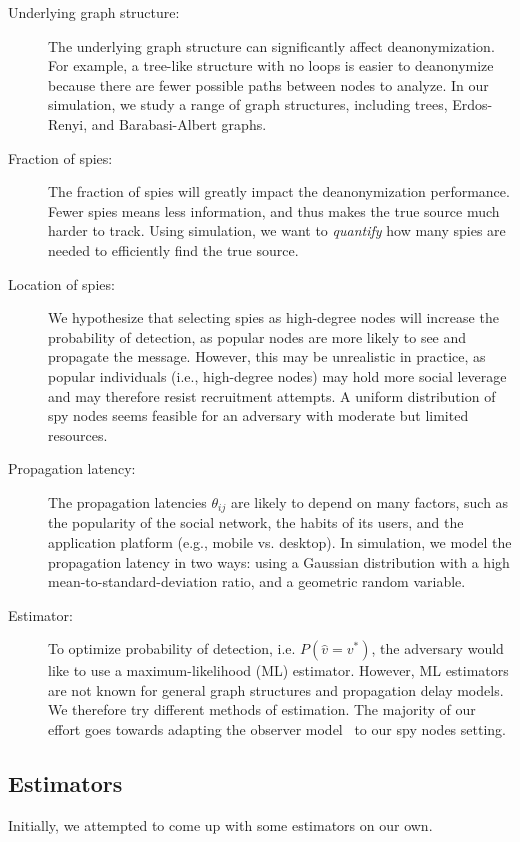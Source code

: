 \begin{description}
\vspace{-0.1in}
\item[Underlying graph structure:] The underlying graph structure can significantly affect deanonymization. For example, a tree-like structure with no loops is easier to deanonymize because there are fewer possible paths between nodes to analyze. In our simulation, we study a range of graph structures, including trees, Erdos-Renyi, and Barabasi-Albert graphs.
\item[Fraction of spies:] The fraction of spies will greatly impact the deanonymization performance. Fewer spies means less information, and thus makes the true source much harder to track. Using simulation, we want to \emph{quantify} how many spies are needed to efficiently find the true source.
\item[Location of spies:] We hypothesize that selecting spies as high-degree nodes will increase the probability of detection, as popular nodes are more likely to see and propagate the message. However, this may be unrealistic in practice, as popular individuals (i.e., high-degree nodes) may hold more social leverage and may therefore resist recruitment attempts. A uniform distribution of spy nodes seems feasible for an adversary with moderate but limited resources. 
\item[Propagation latency:] The propagation latencies $\theta_{ij}$ are likely to depend on many factors, such as the popularity of the social network, the habits of its users, and the application platform (e.g., mobile vs. desktop).
In simulation, we model the propagation latency in two ways: using a Gaussian distribution with a high mean-to-standard-deviation ratio, and a geometric random variable. 
\item[Estimator:] To optimize probability of detection, i.e. $P(\hat v=v^*)$, the adversary would like to use a maximum-likelihood (ML) estimator. However, ML estimators are not known for general graph structures and propagation delay models. We therefore try different methods of estimation. The majority of our effort goes towards adapting the observer model~\cite{pinto} to our spy nodes setting.
\end{description}

\subsection{Estimators}
Initially, we attempted to come up with some estimators on our own. 



